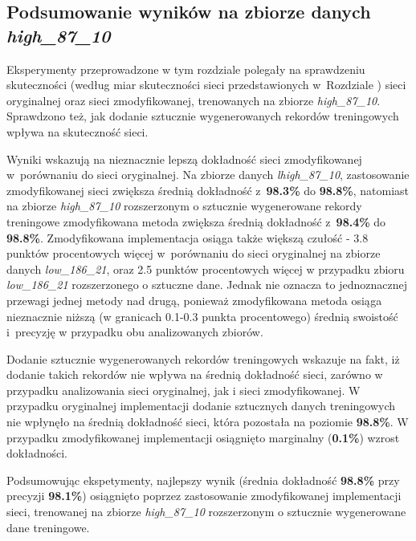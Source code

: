 \subsection{Podsumowanie wyników na zbiorze danych \textit{high\_87\_10}}
Eksperymenty przeprowadzone w tym rozdziale polegały na sprawdzeniu skuteczności (według miar skuteczności sieci przedstawionych w~Rozdziale ) sieci oryginalnej oraz sieci zmodyfikowanej, trenowanych na zbiorze \textit{high\_87\_10}.
Sprawdzono też, jak dodanie sztucznie wygenerowanych rekordów treningowych wpływa na skuteczność sieci.

Wyniki wskazują na nieznacznie lepszą dokładność sieci zmodyfikowanej w~porównaniu do sieci oryginalnej.
Na zbiorze danych \textit{lhigh\_87\_10}, zastosowanie zmodyfikowanej sieci zwiększa średnią dokładność z~\textbf{98.3\%} do \textbf{98.8\%}, natomiast na zbiorze \textit{high\_87\_10} rozszerzonym o sztucznie wygenerowane rekordy treningowe zmodyfikowana metoda zwiększa średnią dokładność z~\textbf{98.4\%} do \textbf{98.8\%}. 
Zmodyfikowana implementacja osiąga także większą czułość - 3.8 punktów procentowych więcej w~porównaniu do sieci oryginalnej na zbiorze danych \textit{low\_186\_21}, oraz 2.5 punktów procentowych więcej w przypadku zbioru \textit{low\_186\_21} rozszerzonego o sztuczne dane.
Jednak nie oznacza to jednoznacznej przewagi jednej metody nad drugą, ponieważ zmodyfikowana metoda osiąga nieznacznie niższą (w granicach 0.1-0.3 punkta procentowego) średnią swoistość i~precyzję w przypadku obu analizowanych zbiorów.


Dodanie sztucznie wygenerowanych rekordów treningowych wskazuje na fakt, iż dodanie takich rekordów nie wpływa na średnią dokładność sieci, zarówno w przypadku analizowania sieci oryginalnej, jak i sieci zmodyfikowanej. W przypadku oryginalnej implementacji dodanie sztucznych danych treningowych nie wpłynęło na średnią dokładność sieci, która pozostała na poziomie \textbf{98.8\%}. W przypadku zmodyfikowanej implementacji osiągnięto marginalny (\textbf{0.1\%}) wzrost dokładności.


Podsumowując ekspetymenty, najlepszy wynik (średnia dokładność \textbf{98.8\%} przy precyzji \textbf{98.1\%}) osiągnięto poprzez zastosowanie zmodyfikowanej implementacji sieci, trenowanej na zbiorze \textit{high\_87\_10} rozszerzonym o sztucznie wygenerowane dane treningowe.
